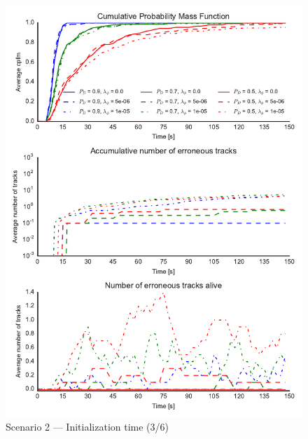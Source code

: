 \begin{figure}
\centering
\includegraphics{Figures/plots/Scenario2_Init-Time(3-6).pdf}
\caption{Scenario 2 --- Initialization time (3/6)}\label{fig:init2_time_3-6}
\end{figure}